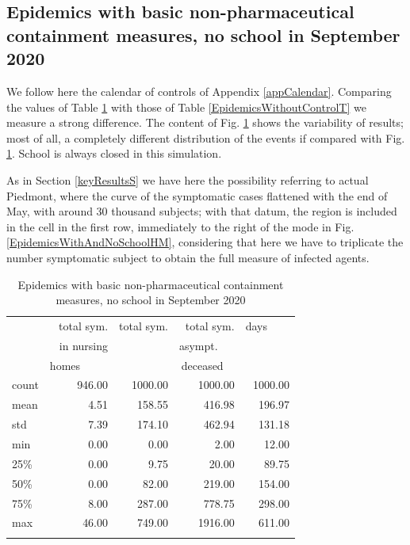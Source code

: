 \documentclass[graybox]{svmult}
\begin{document}
\subsection{Epidemics with basic non-pharmaceutical containment measures, no school in September 2020}
\label{EpidemicsWithAndNoSchoolS}

We follow here the calendar of controls of Appendix \ref{appCalendar}. Comparing the values of Table \ref{EpidemicsWithAndNoSchoolT} with those of Table \ref{EpidemicsWithoutControlT} we measure a strong difference. The content of Fig. \ref{EpidemicsWithAndNoSchoolT} shows the variability of results; most of all, a completely different distribution of the events if compared with Fig. \ref{EpidemicsWithAndNoSchoolT}. School is always closed in this simulation.

As in Section \ref{keyResultsS} we have here the possibility referring to actual Piedmont, where the curve of the symptomatic cases flattened with the end of May, with around 30 thousand subjects; with that datum, the region is included in the cell in the first row, immediately to the right of the mode in Fig. \ref{EpidemicsWithAndNoSchoolHM}, considering that here we have to triplicate the number symptomatic subject to obtain the full measure of infected agents.


\begin{table}[t]
\center
\small
\begin{tabular}{lrrrr}
\hline\noalign{\smallskip}
{} & total sym.        &  total sym. & total sym.     & days~~~~ \\
{} & in nursing        &                  & asympt.~~~  & \\
{} & homes~~~~~  &                  & deceased~~ & \\
\noalign{\smallskip}\svhline\noalign{\smallskip}
count &     946.00 &             1000.00 &                 1000.00 & 1000.00 \\
mean  &       4.51 &              158.55 &                  416.98 &  196.97 \\
std   &       7.39 &              174.10 &                  462.94 &  131.18 \\
min   &       0.00 &                0.00 &                    2.00 &   12.00 \\
25\%   &       0.00 &                9.75 &                   20.00 &   89.75 \\
50\%   &       0.00 &               82.00 &                  219.00 &  154.00 \\
75\%   &       8.00 &              287.00 &                  778.75 &  298.00 \\
max   &      46.00 &              749.00 &                 1916.00 &  611.00 \\
\hline\noalign{\smallskip}
\end{tabular}

\label{EpidemicsWithAndNoSchoolT}
\caption{Epidemics with basic non-pharmaceutical containment measures, no school in September 2020}
\end{table}
\end{document}
